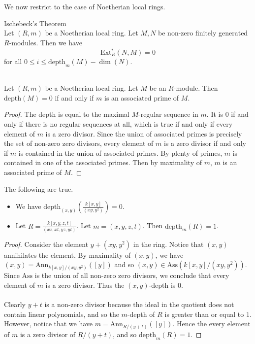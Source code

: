 \documentclass[a4paper]{article}
\begin{document}
We now restrict to the case of Noetherian local rings. 

\begin{thm}{Ischebeck's Theorem}{}\\
Let $(R,m)$ be a Noetherian local ring. Let $M,N$ be non-zero finitely generated $R$-modules. Then we have $$\text{Ext}_R^i(N,M)=0$$ for all $0\leq i\leq\text{depth}_m(M)-\dim(N)$. 
\end{thm}

\begin{lmm}{}{}\\
Let $(R,m)$ be a Noetherian local ring. Let $M$ be an $R$-module. Then $\text{depth}(M)=0$ if and only if $m$ is an associated prime of $M$. 
\begin{proof}
The depth is equal to the maximal $M$-regular sequence in $m$. It is $0$ if and only if there is no regular sequences at all, which is true if and only if every element of $m$ is a zero divisor. Since the union of associated primes is precisely the set of non-zero zero divisors, every element of $m$ is a zero divisor if and only if $m$ is contained in the union of associated primes. By plenty of primes, $m$ is contained in one of the associated primes. Then by maximality of $m$, $m$ is an associated prime of $M$. 
\end{proof}
\end{lmm}

\begin{eg}{} The following are true. 
\begin{itemize}
\item We have $\text{depth}_{(x,y)}\left(\frac{k[x,y]}{(xy,y^2)}\right)=0$. 
\item Let $R=\frac{k[x,y,z,t]}{(xz,xt,yz,yt)}$. Let $m=(x,y,z,t)$. Then $\text{depth}_m(R)=1$. 
\end{itemize} 
\begin{proof}
Consider the element $y+(xy,y^2)$ in the ring. Notice that $(x,y)$ annihilates the element. By maximality of $(x,y)$, we have $(x,y)=\text{Ann}_{k[x,y]/(xy,y^2)}([y])$ and so $(x,y)\in\text{Ass}(k[x,y]/(xy,y^2))$. Since $\text{Ass}$ is the union of all non-zero zero divisors, we conclude that every element of $m$ is a zero divisor. Thus the $(x,y)$-depth is $0$. \\~\\

Clearly $y+t$ is a non-zero divisor because the ideal in the quotient does not contain linear polynomials, and so the $m$-depth of $R$ is greater than or equal to $1$. However, notice that we have $m=\text{Ann}_{R/(y+t)}([y])$. Hence the every element of $m$ is a zero divisor of $R/(y+t)$, and so $\text{depth}_m(R)=1$. 
\end{proof}
\end{eg}
\end{document}
